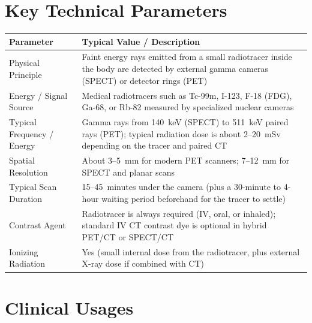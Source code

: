 \section{Key Technical Parameters}
\noindent
\begin{tabularx}{\textwidth}{@{}l X@{}}
\toprule
\textbf{Parameter} & \textbf{Typical Value / Description} \\
\midrule
Physical Principle & Faint energy rays emitted from a small radiotracer inside the body are detected by external gamma cameras (SPECT) or detector rings (PET) \\
Energy / Signal Source & Medical radiotracers such as Tc-99m, I-123, F-18 (FDG), Ga-68, or Rb-82 measured by specialized nuclear cameras \\
Typical Frequency / Energy & Gamma rays from 140~keV (SPECT) to 511~keV paired rays (PET); typical radiation dose is about 2--20~mSv depending on the tracer and paired CT \\
Spatial Resolution & About 3--5~mm for modern PET scanners; 7--12~mm for SPECT and planar scans \\
Typical Scan Duration & 15--45~minutes under the camera (plus a 30-minute to 4-hour waiting period beforehand for the tracer to settle) \\
Contrast Agent & Radiotracer is always required (IV, oral, or inhaled); standard IV CT contrast dye is optional in hybrid PET/CT or SPECT/CT \\
Ionizing Radiation & Yes (small internal dose from the radiotracer, plus external X-ray dose if combined with CT) \\
\bottomrule
\end{tabularx}

\section{Clinical Usages}

